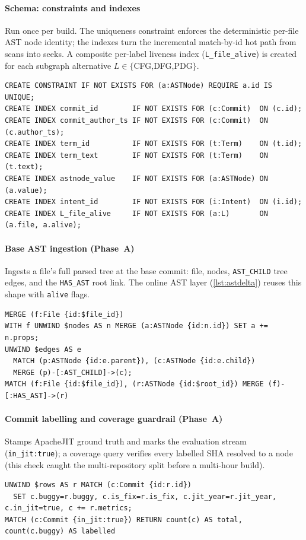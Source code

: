 \documentclass[final,5p,times,twocolumn]{elsarticle}
\theoremstyle{plain}
\begin{document}
\paragraph{Schema: constraints and indexes}
Run once per build. The uniqueness constraint enforces the deterministic per-file AST
node identity; the indexes turn the incremental match-by-id hot path from scans into
seeks. A composite per-label liveness index (\texttt{L\_file\_alive}) is created for each
subgraph alternative $L\in\{$CFG,DFG,PDG$\}$.
\begin{lstlisting}[style=cypher]
CREATE CONSTRAINT IF NOT EXISTS FOR (a:ASTNode) REQUIRE a.id IS UNIQUE;
CREATE INDEX commit_id        IF NOT EXISTS FOR (c:Commit)  ON (c.id);
CREATE INDEX commit_author_ts IF NOT EXISTS FOR (c:Commit)  ON (c.author_ts);
CREATE INDEX term_id          IF NOT EXISTS FOR (t:Term)    ON (t.id);
CREATE INDEX term_text        IF NOT EXISTS FOR (t:Term)    ON (t.text);
CREATE INDEX astnode_value    IF NOT EXISTS FOR (a:ASTNode) ON (a.value);
CREATE INDEX intent_id        IF NOT EXISTS FOR (i:Intent)  ON (i.id);
CREATE INDEX L_file_alive     IF NOT EXISTS FOR (a:L)       ON (a.file, a.alive);
\end{lstlisting}

\paragraph{Base AST ingestion (Phase~A)}
Ingests a file's full parsed tree at the base commit: file, nodes, \texttt{AST\_CHILD}
tree edges, and the \texttt{HAS\_AST} root link. The online AST layer
(\autoref{lst:astdelta}) reuses this shape with \texttt{alive} flags.
\begin{lstlisting}[style=cypher]
MERGE (f:File {id:$file_id})
WITH f UNWIND $nodes AS n MERGE (a:ASTNode {id:n.id}) SET a += n.props;
UNWIND $edges AS e
  MATCH (p:ASTNode {id:e.parent}), (c:ASTNode {id:e.child})
  MERGE (p)-[:AST_CHILD]->(c);
MATCH (f:File {id:$file_id}), (r:ASTNode {id:$root_id}) MERGE (f)-[:HAS_AST]->(r)
\end{lstlisting}

\paragraph{Commit labelling and coverage guardrail (Phase~A)}
Stamps ApacheJIT ground truth and marks the evaluation stream (\texttt{in\_jit:true}); a
coverage query verifies every labelled SHA resolved to a node (this check caught the
multi-repository split before a multi-hour build).
\begin{lstlisting}[style=cypher]
UNWIND $rows AS r MATCH (c:Commit {id:r.id})
  SET c.buggy=r.buggy, c.is_fix=r.is_fix, c.jit_year=r.jit_year, c.in_jit=true, c += r.metrics;
MATCH (c:Commit {in_jit:true}) RETURN count(c) AS total, count(c.buggy) AS labelled
\end{lstlisting}
\end{document}
